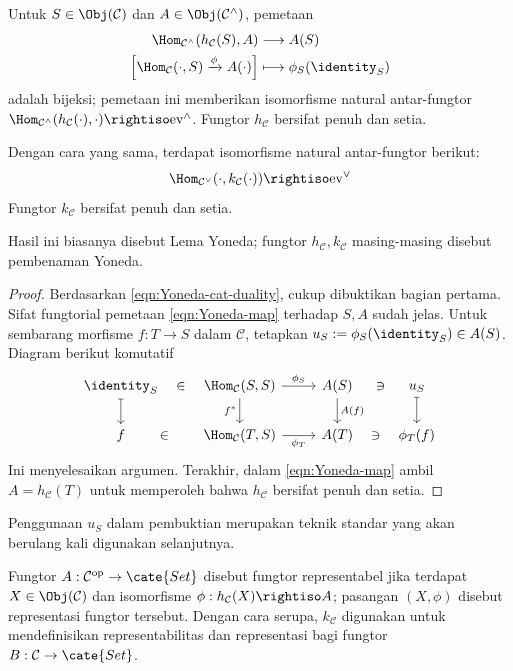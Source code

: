 \begin{theorem}\label{prop:Yoneda-lemma}
	Untuk $S \in \Obj(\mathcal{C})$ dan $A \in \Obj(\mathcal{C}^\wedge)$, pemetaan
	\begin{equation}\label{eqn:Yoneda-map}\begin{aligned}
		\Hom_{\mathcal{C}^\wedge}(h_{\mathcal{C}}(S), A) & \longrightarrow A(S) \\
		\left[ \Hom_{\mathcal{C}}(\cdot, S) \xrightarrow{\phi} A(\cdot) \right] & \longmapsto \phi_S(\identity_S)
	\end{aligned}\end{equation}
	adalah bijeksi; pemetaan ini memberikan isomorfisme natural antar-fungtor $\Hom_{\mathcal{C}^\wedge}(h_{\mathcal{C}}(\cdot), \cdot) \rightiso \text{ev}^\wedge$. Fungtor $h_{\mathcal{C}}$ bersifat penuh dan setia.

	Dengan cara yang sama, terdapat isomorfisme natural antar-fungtor berikut:\[ \Hom_{\mathcal{C}^\vee}(\cdot, k_{\mathcal{C}}(\cdot)) \rightiso \text{ev}^\vee \] Fungtor $k_{\mathcal{C}}$ bersifat penuh dan setia.
\end{theorem}
Hasil ini biasanya disebut Lema Yoneda; fungtor $h_{\mathcal{C}}, k_{\mathcal{C}}$ masing-masing disebut pembenaman Yoneda.

\begin{proof}
	Berdasarkan \eqref{eqn:Yoneda-cat-duality}, cukup dibuktikan bagian pertama. Sifat fungtorial pemetaan \eqref{eqn:Yoneda-map} terhadap $S,A$ sudah jelas. Untuk sembarang morfisme $f: T \to S$ dalam $\mathcal{C}$, tetapkan $u_S := \phi_S(\identity_S) \in A(S)$. Diagram berikut komutatif
	\[ \begin{tikzcd}
		\identity_S \arrow[mapsto, d] \arrow[phantom, r, description, "\in"] & \Hom_{\mathcal{C}}(S, S) \arrow[r, "\phi_S"] \arrow[d, "f^*"'] & A(S) \arrow[d, "A(f)"] & \arrow[phantom, l, description, "\ni"] u_S \arrow[mapsto, d] \\
		f \arrow[phantom, r, description, "\in"] & \Hom_{\mathcal{C}}(T, S) \arrow[r, "\phi_T"'] & A(T) & \arrow[phantom, l, description, "\ni"] \phi_T(f)
	\end{tikzcd} \]
	Ini menyelesaikan argumen. Terakhir, dalam \eqref{eqn:Yoneda-map} ambil $A = h_{\mathcal{C}}(T)$ untuk memperoleh bahwa $h_{\mathcal{C}}$ bersifat penuh dan setia.
\end{proof}

	Penggunaan $u_S$ dalam pembuktian merupakan teknik standar yang akan berulang kali digunakan selanjutnya.
\begin{definition}\label{def:representable-functor}
	Fungtor $A: \mathcal{C}^\text{op} \to \cate{Set}$ disebut fungtor representabel jika terdapat $X \in \Obj(\mathcal{C})$ dan isomorfisme $\phi: h_{\mathcal{C}}(X) \rightiso A$; pasangan $(X, \phi)$ disebut representasi fungtor tersebut. Dengan cara serupa, $k_{\mathcal{C}}$ digunakan untuk mendefinisikan representabilitas dan representasi bagi fungtor $B: \mathcal{C} \to \cate{Set}$.
\end{definition}

